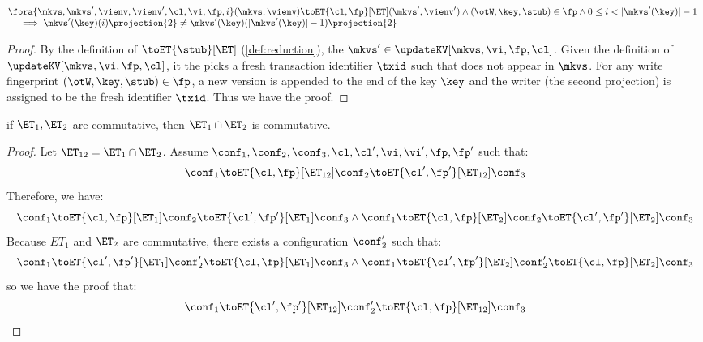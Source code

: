 \begin{lemma}
    \label{lem:unique-writer}
    \[
    \begin{array}{@{}l}
        \fora{\mkvs, \mkvs',\vienv,\vienv', \cl, \vi, \fp, i} 
        (\mkvs, \vienv) \toET{\cl, \fp}[\ET] (\mkvs', \vienv')
        \land (\otW, \key, \stub) \in \fp  
        \land 0 \leq i < \lvert \mkvs'(\key) \rvert - 1 \\
        \quad {} \implies \mkvs'(\key)(i)\projection{2} \neq \mkvs'(\key)(\lvert \mkvs'(\key) \rvert - 1)\projection{2}
    \end{array}
    \]
\end{lemma}
\begin{proof}
    By the definition of \( \toET{\stub}[\ET] \) (\cref{def:reduction}), the \( \mkvs' \in \updateKV[\mkvs, \vi, \fp, \cl] \).
    Given the definition of \( \updateKV[\mkvs, \vi, \fp, \cl]\), it the picks a fresh transaction identifier \( \txid \) such that does not appear in \( \mkvs \).
    For any write fingerprint \( (\otW, \key, \stub) \in \fp \), a new version is appended to the end of the key \( \key \) and the writer (the second projection) is assigned to be the fresh identifier \( \txid \).
    Thus we have the proof.
\end{proof}

\begin{proposition}
\label{thm:appendix-et-composition-2}
\label{prop:appendix-et-composition-2}
if $\ET_1, \ET_2$ are commutative, then $\ET_1 \cap \ET_2$ is commutative.
\end{proposition}
\begin{proof}
Let \( \ET_{12} = \ET_1 \cap \ET_2 \).
Assume \(\conf_1, \conf_2, \conf_3, \cl, \cl', \vi, \vi', \fp, \fp' \) such that:
\[
    \conf_1 \toET{\cl, \fp}[\ET_{12}] \conf_2 \toET{\cl', \fp'}[\ET_{12}] \conf_3
\]
Therefore, we have:
\[
    \conf_1 \toET{\cl, \fp}[\ET_{1}] \conf_2 \toET{\cl', \fp'}[\ET_{1}] \conf_3 \land 
    \conf_1 \toET{\cl, \fp}[\ET_{2}] \conf_2 \toET{\cl', \fp'}[\ET_{2}] \conf_3
\]
Because \( ET_1 \)  and \( \ET_2 \) are commutative, there exists a configuration \( \conf'_2 \) such that:
\[
    \conf_1 \toET{\cl', \fp'}[\ET_{1}] \conf'_2 \toET{\cl, \fp}[\ET_{1}] \conf_3 \land 
    \conf_1 \toET{\cl', \fp'}[\ET_{2}] \conf'_2 \toET{\cl, \fp}[\ET_{2}] \conf_3
\]
so we have the proof that: 
\[
    \conf_1 \toET{\cl', \fp'}[\ET_{12}] \conf'_2 \toET{\cl, \fp}[\ET_{12}] \conf_3
\]
\end{proof}

